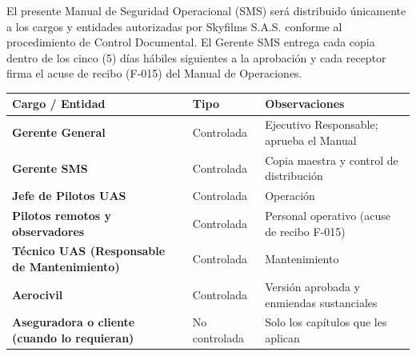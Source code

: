 

El presente Manual de Seguridad Operacional (SMS) será distribuido únicamente a los cargos y entidades autorizadas por Skyfilms S.A.S. conforme al procedimiento de Control Documental. El Gerente SMS entrega cada copia dentro de los cinco (5) días hábiles siguientes a la aprobación y cada receptor firma el acuse de recibo (F-015) del Manual de Operaciones.

\vspace{0.3cm}

\renewcommand{\arraystretch}{1.1}
\setlength{\tabcolsep}{5pt}

\begin{table}[H]
\centering

\begin{tabularx}{\textwidth}{
>{\bfseries}p{6.2cm}
>{\centering\arraybackslash}p{2.6cm}
X}

\toprule

Cargo / Entidad &
Tipo &
Observaciones

\\

\midrule

Gerente General &
Controlada &
Ejecutivo Responsable; aprueba el Manual

\\

Gerente SMS &
Controlada &
Copia maestra y control de distribución

\\

Jefe de Pilotos UAS &
Controlada &
Operación

\\

Pilotos remotos y observadores &
Controlada &
Personal operativo (acuse de recibo F-015)

\\

Técnico UAS (Responsable de Mantenimiento) &
Controlada &
Mantenimiento

\\

Aerocivil &
Controlada &
Versión aprobada y enmiendas sustanciales

\\

Aseguradora o cliente (cuando lo requieran) &
No controlada &
Solo los capítulos que les aplican

\\

\bottomrule

\end{tabularx}

\end{table}

